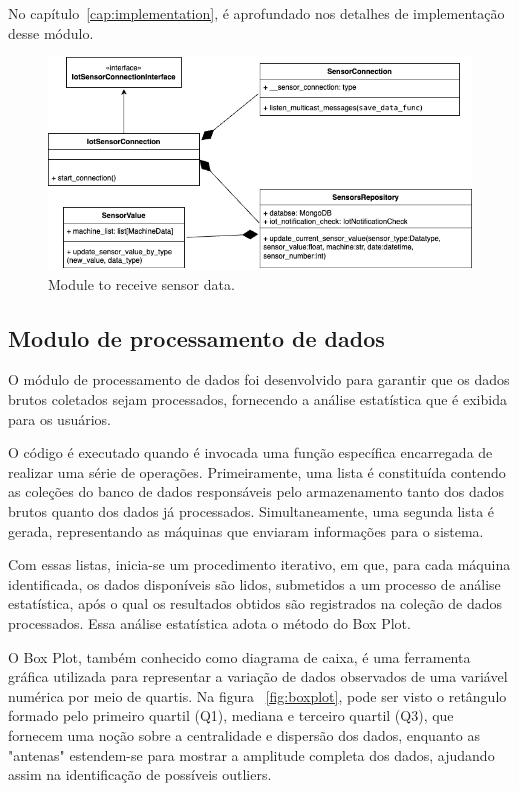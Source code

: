 No capítulo~\ref{cap:implementation}, é aprofundado nos detalhes de implementação desse módulo.


\begin{figure}[htbp]
	\centering
	\includegraphics[width=\textwidth]{images/recebimento_dados.png}
	\caption{Module to receive sensor data.}
	\label{fig:receiveData}
\end{figure}


\subsection{Modulo de processamento de dados}\label{subsec:moduloProcessamento}
O módulo de processamento de dados foi desenvolvido para garantir que os dados brutos coletados sejam processados, fornecendo a análise estatística que é exibida para os usuários.

O código é executado quando é invocada uma função específica encarregada de realizar uma série de operações. Primeiramente, uma lista é constituída contendo as coleções do banco de dados responsáveis pelo armazenamento tanto dos dados brutos quanto dos dados já processados. Simultaneamente, uma segunda lista é gerada, representando as máquinas que enviaram informações para o sistema.

Com essas listas, inicia-se um procedimento iterativo, em que, para cada máquina identificada, os dados disponíveis são lidos, submetidos a um processo de análise estatística, após o qual os resultados obtidos são registrados na coleção de dados processados. Essa análise estatística adota o método do Box Plot.

O Box Plot, também conhecido como diagrama de caixa, é uma ferramenta gráfica utilizada para representar a variação de dados observados de uma variável numérica por meio de quartis. Na figura ~\ref{fig:boxplot}, pode ser visto o retângulo formado pelo primeiro quartil (Q1), mediana e terceiro quartil (Q3), que fornecem uma noção sobre a centralidade e dispersão dos dados, enquanto as "antenas" estendem-se para mostrar a amplitude completa dos dados, ajudando assim na identificação de possíveis outliers.

